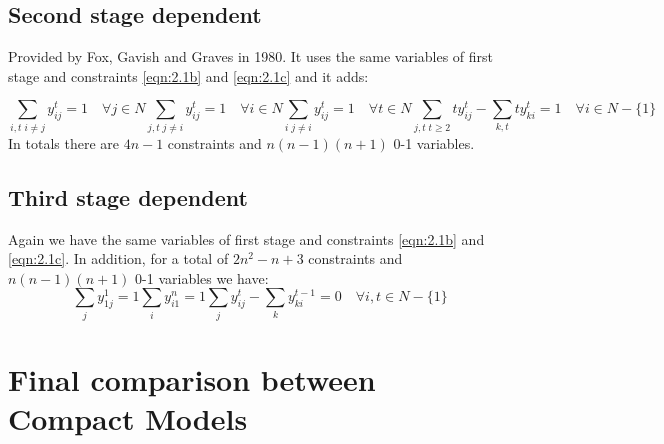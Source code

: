 \subsection{Second stage dependent}
Provided by Fox, Gavish and Graves in 1980. It uses the same variables of first stage and constraints \ref{eqn:2.1b} and \ref{eqn:2.1c} and it adds:

\begin{subequations} 
	\begin{equation}
		\sum_{i,t \; i \neq j} y_{ij}^t = 1 \quad \forall j \in N
	\end{equation}
	\begin{equation}
		\sum_{j,t \; j \neq i} y_{ij}^t = 1 \quad \forall i \in N
	\end{equation}
	\begin{equation}
		\sum_{i \; j \neq i} y_{ij}^t = 1 \quad \forall t \in N
	\end{equation}
	\begin{equation}
		\sum_{j,t \; t \geq 2} ty_{ij}^t - \sum_{k,t} ty_{ki}^t = 1 \quad \forall i \in N-\lbrace 1 \rbrace
	\end{equation}
\end{subequations}
In totals there are $4n-1$ constraints and $n(n-1)(n+1)$ 0-1 variables.

\subsection{Third stage dependent}
Again we have the same variables of first stage and constraints \ref{eqn:2.1b} and \ref{eqn:2.1c}. In addition, 
for a total of $2n^2-n+3$ constraints and $n(n-1)(n+1)$ 0-1 variables we have:
\begin{subequations}
	\begin{equation}
		\sum_{j} y_{1j}^1 = 1
	\end{equation}
	\begin{equation}
		\sum_{i} y_{i1}^n = 1
	\end{equation}
	\begin{equation}
		\sum_{j} y_{ij}^t - \sum_{k} y_{ki}^{t-1} = 0 \quad \forall i,t \in N-\lbrace 1 \rbrace
	\end{equation}
\end{subequations}

\section{Final comparison between Compact Models}

